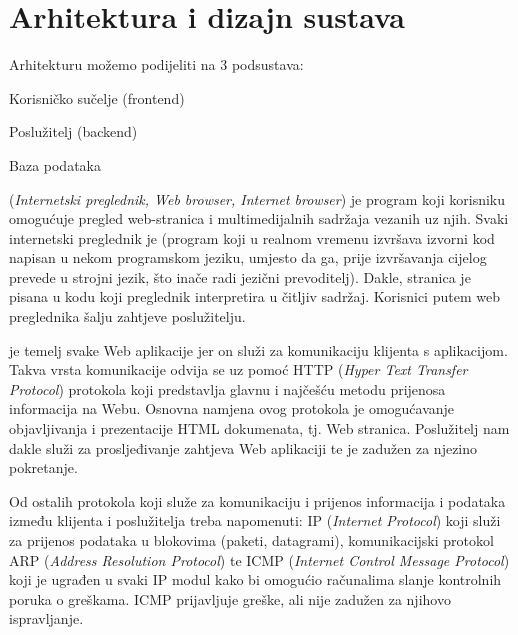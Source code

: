 \chapter{Arhitektura i dizajn sustava}
		
		{Arhitekturu možemo podijeliti na 3 podsustava:}

		\begin{packed_item}
			\item {Korisničko sučelje (frontend)}
			\item {Poslužitelj (backend)}
			\item {Baza podataka}\vspace{0.1cm}
		\end{packed_item}

		{ (\textit{Internetski preglednik, Web browser, Internet browser})  je program koji korisniku omogućuje pregled web-stranica i multimedijalnih sadržaja vezanih uz njih. Svaki internetski preglednik je  (program koji u realnom vremenu izvršava izvorni kod napisan u nekom programskom jeziku, umjesto da ga, prije izvršavanja cijelog prevede u strojni jezik, što inače radi jezični prevoditelj). Dakle, stranica je pisana u kodu koji preglednik interpretira u čitljiv sadržaj. Korisnici putem web preglednika šalju zahtjeve poslužitelju.}\vspace{0.3cm}

		{ je temelj svake Web aplikacije jer on služi za komunikaciju klijenta s aplikacijom. Takva vrsta komunikacije odvija se uz pomoć HTTP (\textit{Hyper Text Transfer Protocol}) protokola koji predstavlja glavnu i najčešću metodu prijenosa informacija na Webu. Osnovna namjena ovog protokola je omogućavanje objavljivanja i prezentacije HTML dokumenata, tj. Web stranica. Poslužitelj nam dakle služi za prosljeđivanje zahtjeva Web aplikaciji te je zadužen za njezino pokretanje.}\vspace{0.3cm}

		{Od ostalih protokola koji služe za komunikaciju i prijenos informacija i podataka između klijenta i poslužitelja treba napomenuti: IP (\textit{Internet Protocol}) koji služi za prijenos podataka u blokovima (paketi, datagrami), komunikacijski protokol ARP (\textit{Address Resolution Protocol}) te ICMP (\textit{Internet Control Message Protocol}) koji je ugrađen u svaki IP modul kako bi omogućio računalima slanje kontrolnih poruka o greškama. ICMP prijavljuje greške, ali nije zadužen za njihovo ispravljanje.}\vspace{0.3cm}


